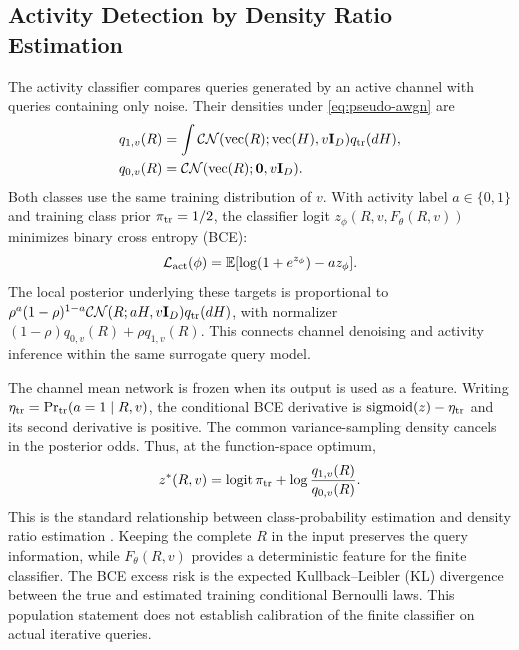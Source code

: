 \documentclass[10pt,a4paper]{article}
\newcommand{\CN}{\mathcal{CN}}
\newcommand{\E}{\mathbb{E}}
\newcommand{\I}{\mathbf{I}}
\newcommand{\vect}{\operatorname{vec}}
\newcommand{\logit}{\operatorname{logit}}
\newcommand{\sigmoid}{\operatorname{sigmoid}}
\begin{document}
\subsection{Activity Detection by Density Ratio Estimation}

The activity classifier compares queries generated by an active channel
with queries containing only noise. Their densities under
\eqref{eq:pseudo-awgn} are
\begin{equation}
 \begin{aligned}
 q_{1,v}(R)&=\int\CN(\vect(R);\vect(H),v\I_D)q_{\rm tr}(dH),\\
 q_{0,v}(R)&=\CN(\vect(R);\mathbf{0},v\I_D).
 \end{aligned}
 \label{eq:query-densities}
\end{equation}
Both classes use the same training distribution of $v$. With activity
label $a\in\{0,1\}$ and training class prior $\pi_{\rm tr}=1/2$, the
classifier logit $z_\phi(R,v,F_\theta(R,v))$ minimizes binary cross
entropy (BCE):
\begin{equation}
 \mathcal{L}_{\rm act}(\phi)=\E[
 \log(1+e^{z_\phi})-a z_\phi].
 \label{eq:classifier-loss}
\end{equation}
The local posterior underlying these targets is proportional to
$\rho^a(1-\rho)^{1-a}\CN(R;aH,v\I_D)q_{\rm tr}(dH)$, with normalizer
$(1-\rho)q_{0,v}(R)+\rho q_{1,v}(R)$. This connects channel denoising
and activity inference within the same surrogate query model.

The channel mean network is frozen when its output is used as a feature.
Writing $\eta_{\rm tr}=\Pr_{\rm tr}(a=1\mid R,v)$, the conditional BCE
derivative is $\sigmoid(z)-\eta_{\rm tr}$ and its second derivative is
positive. The common variance-sampling density cancels in the posterior
odds. Thus, at the function-space optimum,
\begin{equation}
 z^*(R,v)=\logit\pi_{\rm tr}
                       +\log\frac{q_{1,v}(R)}{q_{0,v}(R)}.
 \label{eq:ideal-logit}
\end{equation}
This is the standard relationship between class-probability estimation
and density ratio estimation \cite[Secs.~III--IV]{menon2016}.
Keeping the complete $R$ in the input preserves the query information,
while $F_\theta(R,v)$ provides a deterministic feature for the finite
classifier. The BCE excess risk is the expected Kullback--Leibler (KL) divergence between
the true and estimated training conditional Bernoulli laws. This
population statement does not establish calibration of the finite
classifier on actual iterative queries.
\end{document}
